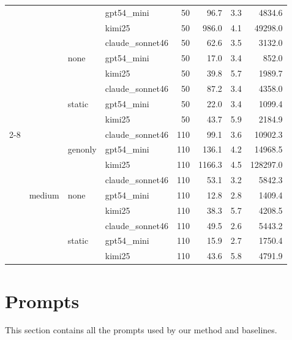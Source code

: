 \documentclass{article}
\begin{document}
\begin{table}[ht]
{\begin{tabular}{llllrrrr}
 &  &                           & gpt54\_mini      & 50 & 96.7   & 3.3 & 4834.6   \\
 &  &                           & kimi25           & 50 & 986.0  & 4.1 & 49298.0  \\
 &  & \multirow{3}{*}{none}     & claude\_sonnet46 & 50 & 62.6   & 3.5 & 3132.0   \\
 &  &                           & gpt54\_mini      & 50 & 17.0   & 3.4 & 852.0    \\
 &  &                           & kimi25           & 50 & 39.8   & 5.7 & 1989.7   \\
 &  & \multirow{3}{*}{static}   & claude\_sonnet46 & 50 & 87.2   & 3.4 & 4358.0   \\
 &  &                           & gpt54\_mini      & 50 & 22.0   & 3.4 & 1099.4   \\
 &  &                           & kimi25           & 50 & 43.7   & 5.9 & 2184.9   \\
\cmidrule{2-8}
 & \multirow{9}{*}{medium}
   & \multirow{3}{*}{genonly}  & claude\_sonnet46 & 110 & 99.1   & 3.6 & 10902.3  \\
 &  &                           & gpt54\_mini      & 110 & 136.1  & 4.2 & 14968.5  \\
 &  &                           & kimi25           & 110 & 1166.3 & 4.5 & 128297.0 \\
 &  & \multirow{3}{*}{none}     & claude\_sonnet46 & 110 & 53.1   & 3.2 & 5842.3   \\
 &  &                           & gpt54\_mini      & 110 & 12.8   & 2.8 & 1409.4   \\
 &  &                           & kimi25           & 110 & 38.3   & 5.7 & 4208.5   \\
 &  & \multirow{3}{*}{static}   & claude\_sonnet46 & 110 & 49.5   & 2.6 & 5443.2   \\
 &  &                           & gpt54\_mini      & 110 & 15.9   & 2.7 & 1750.4   \\
 &  &                           & kimi25           & 110 & 43.6   & 5.8 & 4791.9   \\
\bottomrule
\end{tabular}%
}
\end{table}

\section{Prompts}
\label{app:vesta_prompts}

This section contains all the prompts used by our method and baselines.
\end{document}
